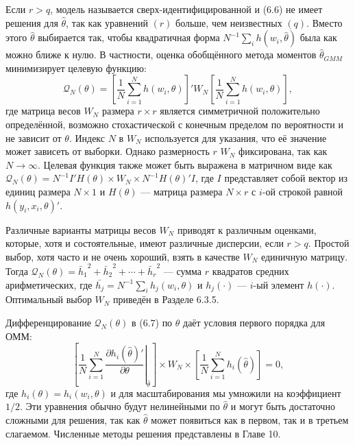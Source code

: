 Если $r>q$, модель называется сверх-идентифицированной и (6.6) не имеет решения для $\hat{\theta}$, так как уравнений $(r)$ больше, чем неизвестных $(q)$. Вместо этого $\hat{\theta}$ выбирается так, чтобы квадратичная форма $N^{-1} \sum_i h(w_i,\hat{\theta})$ была как можно ближе к нулю. В частности, оценка обобщённого
метода моментов $\hat{\theta}_{GMM}$ минимизирует целевую функцию:
\begin{equation}
\mathcal{Q}_{N}(\theta)= \left[ \frac{1}{N} \sum_{i=1}^{N} h(w_i,\theta) \right]' W_N \left[ \frac{1}{N} \sum_{i=1}^{N} h(w_i,\theta) \right],
\end{equation}
где матрица весов $W_N$ размера $r \times r$ является симметричной положительно определённой, возможно стохастической с конечным пределом по вероятности и не зависит от $\theta$. Индекс $N$ в $W_N$ используется для указания, что её значение может зависеть от выборки. Однако размерность $r$ $W_N$ фиксирована, так как $N \rightarrow \infty$. Целевая функция также может быть выражена в матричном виде как $\mathcal{Q}_{N}(\theta)= N^{-1}I'H(\theta) \times W_N \times N^{-1}H(\theta)'I$, где $I$ представляет собой вектор  из единиц размера $N \times 1$ и $H(\theta)$ --- матрица размера $N \times r$ с $i$-ой строкой равной $h(y_i,x_i,\theta)'$.

Различные варианты матрицы весов $W_N$ приводят к различным оценками, которые, хотя и состоятельные, имеют различные дисперсии, если $r>q$. Простой выбор, хотя часто и не очень хороший, взять в качестве $W_N$ единичную матрицу. Тогда $\mathcal{Q}_{N}(\theta)={\bar{h}_1}^2+{\bar{h}_2}^2+\cdots+{\bar{h}_r}^2$ --- сумма $r$ квадратов средних арифметических, где $\bar{h_j}=N^{-1} \sum_i h_j(w_i,\theta)$ и $h_j(\cdot)$ --- $i$-ый элемент $h(\cdot)$. Оптимальный выбор $W_N$ приведён в Разделе 6.3.5.

Дифференцирование $\mathcal{Q}_{N}(\theta)$ в (6.7) по $\theta$ даёт условия первого порядка для ОММ:
\begin{equation}
\left[ \left. \frac{1}{N} \sum_{i=1}^{N} \frac{\partial h_i(\hat{\theta})'}{\partial \theta} \right|_{\hat{\theta}} \right] \times W_N \times \left[ \frac{1}{N} \sum_{i=1}^{N} h_i(\hat{\theta}) \right]=0,
\end{equation} 
где $h_i(\theta)=h_i(w_i,\theta)$ и для масштабирования мы умножили на коэффициент $1/2$. Эти уравнения обычно будут нелинейными по $\hat{\theta}$ и могут быть достаточно сложными для решения, так как $\hat{\theta}$  может появиться как в первом, так и в третьем слагаемом. Численные методы решения представлены в Главе 10.

